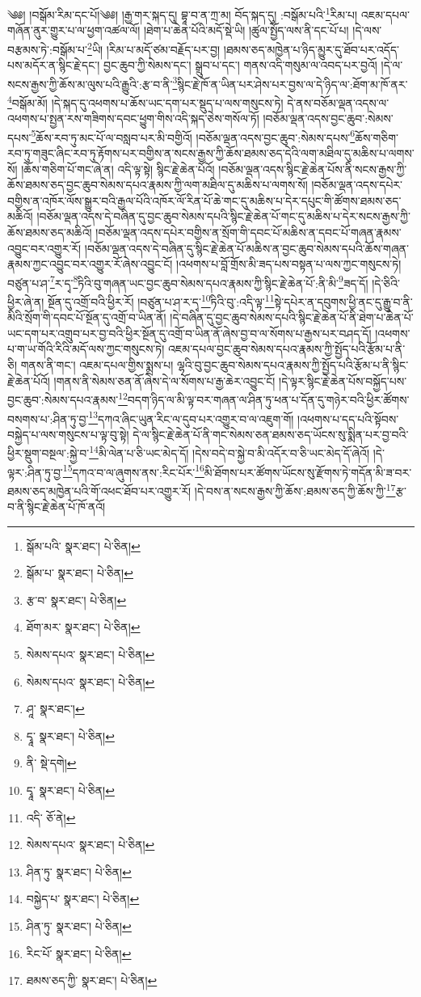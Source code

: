 \setcounter{footnote}{0} 
༄༅། །བསྒོམ་རིམ་དང་པོ།༄༅། །རྒྱ་གར་སྐད་དུ། བྷཱ་བ་ན་ཀྲ་མ། བོད་སྐད་དུ། :བསྒོམ་པའི་\footnote{སྒོམ་པའི་  སྣར་ཐང་།  པེ་ཅིན། }རིམ་པ། འཇམ་དཔལ་གཞོན་ནུར་གྱུར་པ་ལ་ཕྱག་འཚལ་ལོ། །ཐེག་པ་ཆེན་པོའི་མདོ་སྡེ་ཡི། །ཚུལ་སྤྱོད་ལས་ནི་དང་པོ་པ། །དེ་ལས་བརྩམས་ཏེ་:བསྒོམ་པ་\footnote{སྒོམ་པ་  སྣར་ཐང་།  པེ་ཅིན། }ཡི། །རིམ་པ་མདོ་ཙམ་བརྗོད་པར་བྱ། །ཐམས་ཅད་མཁྱེན་པ་ཉིད་མྱུར་དུ་ཐོབ་པར་འདོད་པས་མདོར་ན་སྙིང་རྗེ་དང་། བྱང་ཆུབ་ཀྱི་སེམས་དང་། སྒྲུབ་པ་དང་། གནས་འདི་གསུམ་ལ་འབད་པར་བྱའོ། །དེ་ལ་སངས་རྒྱས་ཀྱི་ཆོས་མ་ལུས་པའི་རྒྱུའི་:རྩ་བ་ནི་\footnote{རྩ་བ་  སྣར་ཐང་།  པེ་ཅིན། }སྙིང་རྗེ་ཁོ་ན་ཡིན་པར་ཤེས་པར་བྱས་ལ་དེ་ཉིད་ལ་:ཐོག་མ་ཁོ་ནར་\footnote{ཐོག་མར་  སྣར་ཐང་།  པེ་ཅིན། }བསྒོམ་མོ། །དེ་སྐད་དུ་འཕགས་པ་ཆོས་ཡང་དག་པར་སྡུད་པ་ལས་གསུངས་ཏེ། དེ་ནས་བཅོམ་ལྡན་འདས་ལ་འཕགས་པ་སྤྱན་རས་གཟིགས་དབང་ཕྱུག་གིས་འདི་སྐད་ཅེས་གསོལ་ཏོ། །བཅོམ་ལྡན་འདས་བྱང་ཆུབ་:སེམས་དཔས་\footnote{སེམས་དཔའ་  སྣར་ཐང་།  པེ་ཅིན། }ཆོས་རབ་ཏུ་མང་པོ་ལ་བསླབ་པར་མི་བགྱིའོ། །བཅོམ་ལྡན་འདས་བྱང་ཆུབ་:སེམས་དཔས་\footnote{སེམས་དཔའ་  སྣར་ཐང་།  པེ་ཅིན། }ཆོས་གཅིག་རབ་ཏུ་གཟུང་ཞིང་རབ་ཏུ་རྟོགས་པར་བགྱིས་ན་སངས་རྒྱས་ཀྱི་ཆོས་ཐམས་ཅད་དེའི་ལག་མཐིལ་དུ་མཆིས་པ་ལགས་སོ། །ཆོས་གཅིག་པོ་གང་ཞེ་ན། འདི་ལྟ་སྟེ། སྙིང་རྗེ་ཆེན་པོའོ། །བཅོམ་ལྡན་འདས་སྙིང་རྗེ་ཆེན་པོས་ནི་སངས་རྒྱས་ཀྱི་ཆོས་ཐམས་ཅད་བྱང་ཆུབ་སེམས་དཔའ་རྣམས་ཀྱི་ལག་མཐིལ་དུ་མཆིས་པ་ལགས་སོ། །བཅོམ་ལྡན་འདས་དཔེར་བགྱིས་ན་འཁོར་ལོས་སྒྱུར་བའི་རྒྱལ་པོའི་འཁོར་ལོ་རིན་པོ་ཆེ་གང་དུ་མཆིས་པ་དེར་དཔུང་གི་ཚོགས་ཐམས་ཅད་མཆིའོ། །བཅོམ་ལྡན་འདས་དེ་བཞིན་དུ་བྱང་ཆུབ་སེམས་དཔའི་སྙིང་རྗེ་ཆེན་པོ་གང་དུ་མཆིས་པ་དེར་སངས་རྒྱས་ཀྱི་ཆོས་ཐམས་ཅད་མཆིའོ། །བཅོམ་ལྡན་འདས་དཔེར་བགྱིས་ན་སྲོག་གི་དབང་པོ་མཆིས་ན་དབང་པོ་གཞན་རྣམས་འབྱུང་བར་འགྱུར་རོ། །བཅོམ་ལྡན་འདས་དེ་བཞིན་དུ་སྙིང་རྗེ་ཆེན་པོ་མཆིས་ན་བྱང་ཆུབ་སེམས་དཔའི་ཆོས་གཞན་རྣམས་ཀྱང་འབྱུང་བར་འགྱུར་རོ་ཞེས་འབྱུང་ངོ། །འཕགས་པ་བློ་གྲོས་མི་ཟད་པས་བསྟན་པ་ལས་ཀྱང་གསུངས་ཏེ། བཙུན་པ་ཤ་\footnote{ཤཱ་  སྣར་ཐང་། }ར་དྭ་\footnote{དྭཱ་  སྣར་ཐང་།  པེ་ཅིན། }ཏིའི་བུ་གཞན་ཡང་བྱང་ཆུབ་སེམས་དཔའ་རྣམས་ཀྱི་སྙིང་རྗེ་ཆེན་པོ་:ནི་མི་\footnote{ནི་  སྡེ་དགེ། }ཟད་དོ། །དེ་ཅིའི་ཕྱིར་ཞེ་ན། སྔོན་དུ་འགྲོ་བའི་ཕྱིར་རོ། །བཙུན་པ་ཤ་ར་དྭ་\footnote{དྭཱ་  སྣར་ཐང་།  པེ་ཅིན། }ཏིའི་བུ་:འདི་ལྟ་\footnote{འདི་  ཅོ་ནེ། }སྟེ་དཔེར་ན་དབུགས་ཕྱི་ནང་དུ་རྒྱུ་བ་ནི་མིའི་སྲོག་གི་དབང་པོ་སྔོན་དུ་འགྲོ་བ་ཡིན་ནོ། །དེ་བཞིན་དུ་བྱང་ཆུབ་སེམས་དཔའི་སྙིང་རྗེ་ཆེན་པོ་ནི་ཐེག་པ་ཆེན་པོ་ཡང་དག་པར་འགྲུབ་པར་བྱ་བའི་ཕྱིར་སྔོན་དུ་འགྲོ་བ་ཡིན་ནོ་ཞེས་བྱ་བ་ལ་སོགས་པ་རྒྱས་པར་བཤད་དོ། །འཕགས་པ་ག་ཡ་གོའི་རིའི་མདོ་ལས་ཀྱང་གསུངས་ཏེ། འཇམ་དཔལ་བྱང་ཆུབ་སེམས་དཔའ་རྣམས་ཀྱི་སྤྱོད་པའི་རྩོམ་པ་ནི་ཅི། གནས་ནི་གང་། འཇམ་དཔལ་གྱིས་སྨྲས་པ། ལྷའི་བུ་བྱང་ཆུབ་སེམས་དཔའ་རྣམས་ཀྱི་སྤྱོད་པའི་རྩོམ་པ་ནི་སྙིང་རྗེ་ཆེན་པོའོ། །གནས་ནི་སེམས་ཅན་ནོ་ཞེས་དེ་ལ་སོགས་པ་རྒྱ་ཆེར་འབྱུང་ངོ། །དེ་ལྟར་སྙིང་རྗེ་ཆེན་པོས་བསྐྱོད་པས་བྱང་ཆུབ་:སེམས་དཔའ་རྣམས་\footnote{སེམས་དཔའ་  སྣར་ཐང་།  པེ་ཅིན། }བདག་ཉིད་ལ་མི་ལྟ་བར་གཞན་ལ་ཤིན་ཏུ་ཕན་པ་དོན་དུ་གཉེར་བའི་ཕྱིར་ཚོགས་བསགས་པ་:ཤིན་ཏུ་བྱ་\footnote{ཤིན་ཏུ་  སྣར་ཐང་།  པེ་ཅིན། }དཀའ་ཞིང་ཡུན་རིང་ལ་དུབ་པར་འགྱུར་བ་ལ་འཇུག་གོ། །འཕགས་པ་དད་པའི་སྟོབས་བསྐྱེད་པ་ལས་གསུངས་པ་ལྟ་བུ་སྟེ། དེ་ལ་སྙིང་རྗེ་ཆེན་པོ་ནི་གང་སེམས་ཅན་ཐམས་ཅད་ཡོངས་སུ་སྨིན་པར་བྱ་བའི་ཕྱིར་སྡུག་བསྔལ་:སྐྱེ་བ་\footnote{བསྐྱེད་པ་  སྣར་ཐང་།  པེ་ཅིན། }མི་ལེན་པ་ཅི་ཡང་མེད་དོ། །དེས་བདེ་བ་སྐྱེ་བ་མི་འདོར་བ་ཅི་ཡང་མེད་དོ་ཞེའོ། །དེ་ལྟར་:ཤིན་ཏུ་བྱ་\footnote{ཤིན་ཏུ་  སྣར་ཐང་།  པེ་ཅིན། }དཀའ་བ་ལ་ཞུགས་ནས་:རིང་པོར་\footnote{རིང་པོ་  སྣར་ཐང་།  པེ་ཅིན། }མི་ཐོགས་པར་ཚོགས་ཡོངས་སུ་རྫོགས་ཏེ་གདོན་མི་ཟ་བར་ཐམས་ཅད་མཁྱེན་པའི་གོ་འཕང་ཐོབ་པར་འགྱུར་རོ། །དེ་བས་ན་སངས་རྒྱས་ཀྱི་ཆོས་:ཐམས་ཅད་ཀྱི་ཆོས་ཀྱི་\footnote{ཐམས་ཅད་ཀྱི་  སྣར་ཐང་།  པེ་ཅིན། }རྩ་བ་ནི་སྙིང་རྗེ་ཆེན་པོ་ཁོ་ནའོ། 
